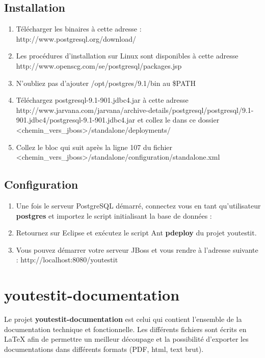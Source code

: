 \subsection{Installation}
\begin{enumerate}
	\item Télécharger les binaires à cette adresse : http://www.postgresql.org/download/

	\item Les procédures d'installation sur Linux sont disponibles à cette adresse http://www.openscg.com/se/postgresql/packages.jsp

	\item N'oubliez pas d'ajouter /opt/postgres/9.1/bin au \$PATH

	\item Téléchargez postgresql-9.1-901.jdbc4.jar à cette adresse http://www.jarvana.com/jarvana/archive-details/postgresql/postgresql/9.1-901.jdbc4/postgresql-9.1-901.jdbc4.jar 
et collez le dans ce dossier <chemin_vers_jboss>/standalone/deployments/

	\item Collez le bloc qui suit après la ligne 107 du fichier <chemin_vers_jboss>/standalone/configuration/standalone.xml 
	 
	
\end{enumerate}

\subsection{Configuration}
\begin{enumerate}
	\item Une fois le serveur PostgreSQL démarré, connectez vous en tant qu'utilisateur \textbf{postgres} et importez le script initialisant la base de données :
	 

	\item Retournez sur Eclipse et exécutez le script Ant \textbf{pdeploy} du projet youtestit.

	\item Vous pouvez démarrer votre serveur JBoss et vous rendre à l'adresse suivante : http://localhost:8080/youtestit
\end{enumerate}


\section{youtestit-documentation}
Le projet \textbf{youtestit-documentation} est celui qui contient l'ensemble de la documentation
technique et fonctionnelle. Les différents fichiers sont écrits en LaTeX afin de permettre un meilleur
découpage et la possibilité d'exporter les documentations dans différents formats (PDF, html, text brut).


